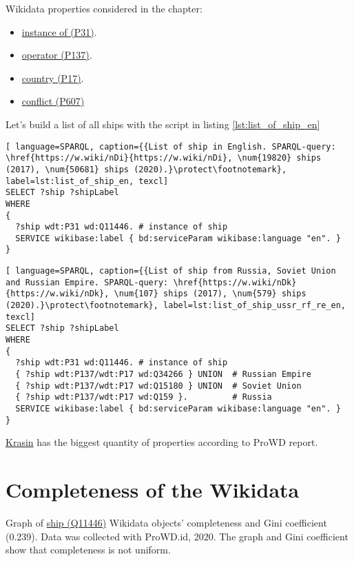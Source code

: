 Wikidata properties considered in the chapter: 
\begin{itemize}
  \item \href{https://www.wikidata.org/wiki/Property:P31}{instance of (P31)}.
  \item \href{https://www.wikidata.org/wiki/Property:P137}{operator (P137)}.
  \item \href{https://www.wikidata.org/wiki/Property:P17}{country (P17)}.
  \item \href{https://www.wikidata.org/wiki/Property:P607}{conflict (P607)}
\end{itemize}

Let's build a list of all ships with the script in listing \ref{lst:list_of_ship_en}

\begin{lstlisting}[ language=SPARQL, caption={{List of ship in English. SPARQL-query: \href{https://w.wiki/nDi}{https://w.wiki/nDi}, \num{19820} ships (2017), \num{50681} ships (2020).}\protect\footnotemark}, label=lst:list_of_ship_en, texcl]
SELECT ?ship ?shipLabel
WHERE
{
  ?ship wdt:P31 wd:Q11446. # instance of ship
  SERVICE wikibase:label { bd:serviceParam wikibase:language "en". }
}
\end{lstlisting}

  
\begin{lstlisting}[ language=SPARQL, caption={{List of ship from Russia, Soviet Union and Russian Empire. SPARQL-query: \href{https://w.wiki/nDk}{https://w.wiki/nDk}, \num{107} ships (2017), \num{579} ships (2020).}\protect\footnotemark}, label=lst:list_of_ship_ussr_rf_re_en, texcl]
SELECT ?ship ?shipLabel
WHERE
{
  ?ship wdt:P31 wd:Q11446. # instance of ship
  { ?ship wdt:P137/wdt:P17 wd:Q34266 } UNION  # Russian Empire
  { ?ship wdt:P137/wdt:P17 wd:Q15180 } UNION  # Soviet Union
  { ?ship wdt:P137/wdt:P17 wd:Q159 }.         # Russia
  SERVICE wikibase:label { bd:serviceParam wikibase:language "en". }
}
\end{lstlisting}

\href{https://www.wikidata.org/wiki/Q281147}{Krasin} has the biggest quantity of properties according to ProWD report\cite{ProWD_ru_ships}.
  


\section{Completeness of the Wikidata}

\begin{marginfigure}[0.0cm]
  {
    \setlength{\fboxsep}{0pt}%
    \setlength{\fboxrule}{1pt}%
  }
  \caption{
    Graph of \href{https://www.wikidata.org/wiki/Q11446}{ship (Q11446)} Wikidata objects' completeness and Gini coefficient (0.239). Data was collected with ProWD.id, 2020. The graph and Gini coefficient show that completeness is not uniform.
    }%
    \label{fig:prowd_ships-unbalanced}%
\end{marginfigure}



